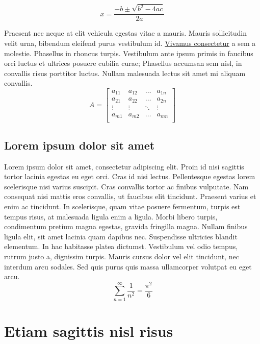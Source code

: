 \documentclass[a4paper, 12pt]{article}
\begin{document}
\begin{equation}
x = \frac{-b \pm \sqrt{b^2 - 4ac}}{2a}
\end{equation}

Praesent nec neque at elit vehicula egestas vitae a mauris. Mauris sollicitudin velit urna, bibendum eleifend purus vestibulum id. \underline{Vivamus consectetur} a sem a molestie. Phasellus in rhoncus turpis. Vestibulum ante ipsum primis in faucibus orci luctus et ultrices posuere cubilia curae; Phasellus accumsan sem nisl, in convallis risus porttitor luctus. Nullam malesuada lectus sit amet mi aliquam convallis.
\begin{equation}
A = \begin{bmatrix}
a_{11} & a_{12} & \dots & a_{1n} \\
a_{21} & a_{22} & \dots & a_{2n} \\
\vdots & \vdots & \ddots & \vdots \\
a_{m1} & a_{m2} & \dots & a_{mn} \\
\end{bmatrix}
\end{equation}

\subsection{Lorem ipsum dolor sit amet}

Lorem ipsum dolor sit amet, consectetur adipiscing elit. Proin id nisi sagittis tortor lacinia egestas eu eget orci. Cras id nisi lectus. Pellentesque egestas lorem scelerisque nisi varius suscipit. Cras convallis tortor ac finibus vulputate. Nam consequat nisi mattis \cite{4} eros convallis, ut faucibus elit tincidunt. Praesent varius et enim ac tincidunt. In scelerisque, quam vitae posuere fermentum, turpis est tempus risus, at malesuada ligula enim a ligula. Morbi libero turpis, condimentum pretium magna egestas, gravida fringilla magna. Nullam finibus ligula elit, sit amet lacinia quam dapibus nec. Suspendisse ultricies blandit elementum. In hac habitasse platea dictumst. Vestibulum vel odio tempus, rutrum justo a, dignissim turpis. Mauris cursus dolor vel elit tincidunt, nec interdum arcu sodales. Sed quis purus quis massa ullamcorper volutpat eu eget arcu.
\begin{equation}
\sum_{n=1}^\infty \frac{1}{n^2} = \frac{\pi^2}{6}
\end{equation}

\section{Etiam sagittis nisl risus}
\end{document}
